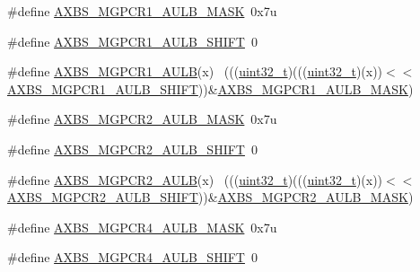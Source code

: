 \begin{DoxyCompactItemize}
\item 
\#define \hyperlink{group___a_x_b_s___register___masks_gaefd2ffd8d80f4eb9fd14f3c5a3a7b629}{A\+X\+B\+S\+\_\+\+M\+G\+P\+C\+R1\+\_\+\+A\+U\+L\+B\+\_\+\+M\+A\+SK}~0x7u
\item 
\#define \hyperlink{group___a_x_b_s___register___masks_gab45b6c2302bbf061fd1c43d436659bd7}{A\+X\+B\+S\+\_\+\+M\+G\+P\+C\+R1\+\_\+\+A\+U\+L\+B\+\_\+\+S\+H\+I\+FT}~0
\item 
\#define \hyperlink{group___a_x_b_s___register___masks_gaec7d467e7988f6765f7d0c5b9fd9f362}{A\+X\+B\+S\+\_\+\+M\+G\+P\+C\+R1\+\_\+\+A\+U\+LB}(x)                                        ~(((\hyperlink{_p_e___types_8h_a33594304e786b158f3fb30289278f5af}{uint32\+\_\+t})(((\hyperlink{_p_e___types_8h_a33594304e786b158f3fb30289278f5af}{uint32\+\_\+t})(x))$<$$<$\hyperlink{group___a_x_b_s___register___masks_gab45b6c2302bbf061fd1c43d436659bd7}{A\+X\+B\+S\+\_\+\+M\+G\+P\+C\+R1\+\_\+\+A\+U\+L\+B\+\_\+\+S\+H\+I\+FT}))\&\hyperlink{group___a_x_b_s___register___masks_gaefd2ffd8d80f4eb9fd14f3c5a3a7b629}{A\+X\+B\+S\+\_\+\+M\+G\+P\+C\+R1\+\_\+\+A\+U\+L\+B\+\_\+\+M\+A\+SK})
\item 
\#define \hyperlink{group___a_x_b_s___register___masks_ga454fa34b9ad3a689e961506a253e3775}{A\+X\+B\+S\+\_\+\+M\+G\+P\+C\+R2\+\_\+\+A\+U\+L\+B\+\_\+\+M\+A\+SK}~0x7u
\item 
\#define \hyperlink{group___a_x_b_s___register___masks_ga0e4aa4214fd104e88a02473e0bf30c7f}{A\+X\+B\+S\+\_\+\+M\+G\+P\+C\+R2\+\_\+\+A\+U\+L\+B\+\_\+\+S\+H\+I\+FT}~0
\item 
\#define \hyperlink{group___a_x_b_s___register___masks_ga917672f09d862ed9ebb0c5419c7f983a}{A\+X\+B\+S\+\_\+\+M\+G\+P\+C\+R2\+\_\+\+A\+U\+LB}(x)                                        ~(((\hyperlink{_p_e___types_8h_a33594304e786b158f3fb30289278f5af}{uint32\+\_\+t})(((\hyperlink{_p_e___types_8h_a33594304e786b158f3fb30289278f5af}{uint32\+\_\+t})(x))$<$$<$\hyperlink{group___a_x_b_s___register___masks_ga0e4aa4214fd104e88a02473e0bf30c7f}{A\+X\+B\+S\+\_\+\+M\+G\+P\+C\+R2\+\_\+\+A\+U\+L\+B\+\_\+\+S\+H\+I\+FT}))\&\hyperlink{group___a_x_b_s___register___masks_ga454fa34b9ad3a689e961506a253e3775}{A\+X\+B\+S\+\_\+\+M\+G\+P\+C\+R2\+\_\+\+A\+U\+L\+B\+\_\+\+M\+A\+SK})
\item 
\#define \hyperlink{group___a_x_b_s___register___masks_ga0e8cb920fbcfaaefe210dedc102129d1}{A\+X\+B\+S\+\_\+\+M\+G\+P\+C\+R4\+\_\+\+A\+U\+L\+B\+\_\+\+M\+A\+SK}~0x7u
\item 
\#define \hyperlink{group___a_x_b_s___register___masks_gaf8f91ac5ba555a8dc2a1733463145139}{A\+X\+B\+S\+\_\+\+M\+G\+P\+C\+R4\+\_\+\+A\+U\+L\+B\+\_\+\+S\+H\+I\+FT}~0

\end{DoxyCompactItemize}
